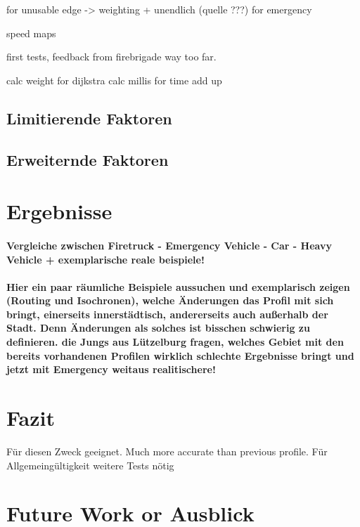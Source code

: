 \documentclass[12pt,a4paper]{article}
\begin{document}
 for unusable edge -> weighting + unendlich (quelle ???)
 for emergency 
 
speed maps

first tests, feedback from firebrigade
way too far.

calc weight for dijkstra
calc millis for time add up



\subsection{Limitierende Faktoren}

\subsection{Erweiternde Faktoren}

\newpage
\section{Ergebnisse}
\paragraph{
Vergleiche zwischen Firetruck - Emergency Vehicle - Car - Heavy Vehicle
+ exemplarische reale beispiele!
}
\paragraph{
\color{red}
Hier ein paar räumliche Beispiele aussuchen und exemplarisch zeigen (Routing und Isochronen), welche Änderungen das Profil mit sich bringt, einerseits innerstädtisch, andererseits auch außerhalb der Stadt. Denn Änderungen als solches ist bisschen schwierig zu definieren. die Jungs aus Lützelburg fragen, welches Gebiet mit den bereits vorhandenen Profilen wirklich schlechte Ergebnisse bringt und jetzt mit Emergency weitaus realitischere!
}

\newpage
\section{Fazit}

Für diesen Zweck geeignet.
Much more accurate than previous profile. 
Für Allgemeingültigkeit weitere Tests nötig


\newpage
\section{Future Work or Ausblick}
\end{document}

